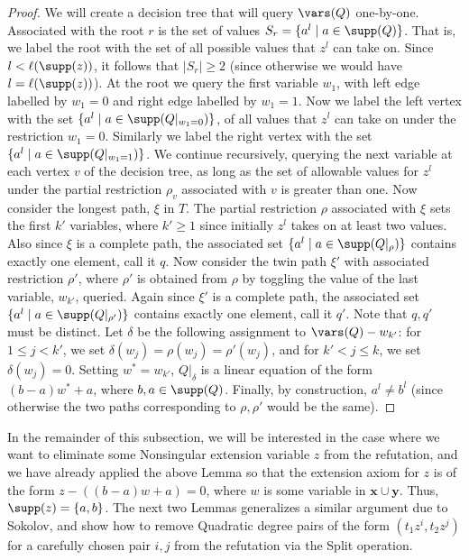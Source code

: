 \begin{proof}
We will create a decision tree that will query $\vars(Q)$ one-by-one. Associated with the root $r$ is the set of values $S_r=\{a^l\mid a\in\supp(Q)\}$. That is, we label the root with the set of all possible values that $z^l$ can take on. Since $l<\ell(\supp(z))$, it follows that $|S_r|\geq2$ (since otherwise we would have $l=\ell(\supp(z))$). At the root we query the first variable $w_1$, with left edge labelled by $w_1=0$ and right edge labelled by $w_1=1$. Now we label the left vertex with the set $\{a^l\mid a\in\supp(Q|_{w_1=0})\}$, of all values that $z^l$ can take on under the restriction $w_1=0$. Similarly we label the right vertex with the set $\{a^l\mid a\in\supp(Q|_{w_1=1})\}$. We continue recursively, querying the next variable at each vertex $v$ of the decision tree, as long as the set of allowable values for $z^l$ under the partial restriction $\rho_v$ associated with $v$ is greater than one. Now consider the longest path, $\xi$ in $T$. The partial restriction $\rho$ associated with $\xi$ sets the first $k'$ variables, where $k'\geq1$ since initially $z^l$ takes on at least two values. Also since $\xi$ is a complete path, the associated set $\{a^l\mid a\in\supp(Q|_{\rho})\}$ contains exactly one element, call it $q$.
Now consider the twin path $\xi'$ with associated restriction $\rho'$, where $\rho'$ is obtained from $\rho$ by toggling the value of the last variable, $w_{k'}$, queried. Again since $\xi'$ is a complete path, the associated set $\{a^l\mid a\in\supp(Q|_{\rho'})\}$ contains exactly one element, call it $q'$. Note that $q,q'$ must be distinct.
Let $\delta$ be the following assignment to $\vars(Q)-w_{k'}$: for $1\leq j<k'$, we set $\delta(w_j)=\rho(w_j)=\rho'(w_j)$, and for $k'<j\leq k$, we set $\delta(w_j)=0$. Setting $w^*=w_{k'}$, $Q|_{\delta}$ is a linear equation of the form $(b-a)w^*+a$, where $b,a\in\supp(Q)$. Finally, by construction, $a^l\neq b^l$ (since otherwise the two paths corresponding to $\rho,\rho'$ would be the same).
\end{proof}
In the remainder of this subsection, we will be interested in the case where we want to eliminate some Nonsingular extension variable $z$ from the refutation, and we have already applied the above Lemma so that the extension axiom for $z$ is of the form $z-((b-a)w+a)=0$, where $w$ is some variable in $\mathbf x\cup\mathbf y$. Thus, $\supp(z)=\{a,b\}$. The next two Lemmas generalizes a similar argument due to Sokolov, and show how to remove Quadratic degree pairs of the form $(t_1z^i,t_2z^j)$ for a carefully chosen pair $i,j$ from the refutation via the Split operation.
